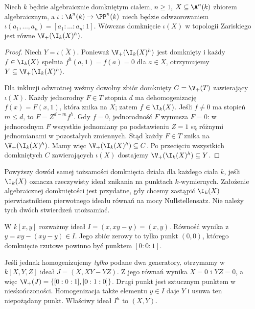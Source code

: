 \begin{twierdzenie}
\label{tw:projective-closure}
Niech $k$ będzie algebraicznie domkniętym ciałem,
$n\ge1$, $X\subseteq\A^n(k)$ zbiorem algebraicznym,
a $\iota:\A^n(k)\to\PP^n(k)$ niech będzie odwzorowaniem
$\iota(a_1,\dots,a_n)=[a_1:\dots:a_n:1]$.
Wówczas domknięcie $\iota(X)$ w topologii Zariskiego jest równe
$\V_+(\I_k(X)^h)$.
\end{twierdzenie}
\begin{proof}
Niech $Y=\overline{\iota(X)}$.
Ponieważ $\V_+(\I_k(X)^h)$ jest domknięty i każdy
$f\in\I_k(X)$ spełnia $f^h(a,1)=f(a)=0$ dla $a\in X$,
otrzymujemy $Y\subseteq\V_+(\I_k(X)^h)$.

Dla inkluzji odwrotnej weźmy dowolny zbiór domknięty
$C=\V_+(T)$ zawierający $\iota(X)$.
Każdy jednorodny $F\in T$ stopnia $d$ ma dehomogenizację
$f(x)=F(x,1)$, która znika na $X$; zatem $f\in\I_k(X)$.
Jeśli $f\ne0$ ma stopień $m\le d$, to
$F=Z^{d-m}f^h$. Gdy $f=0$, jednorodność $F$ wymusza
$F=0$: w jednorodnym $F$ wszystkie jednomiany po podstawieniu
$Z=1$ są różnymi jednomianami w pozostałych zmiennych.
Stąd każdy $F\in T$ znika na $\V_+(\I_k(X)^h)$.
Mamy więc $\V_+(\I_k(X)^h)\subseteq C$.
Po przecięciu wszystkich domkniętych $C$ zawierających
$\iota(X)$ dostajemy $\V_+(\I_k(X)^h)\subseteq Y$.
\end{proof}

\begin{uwaga}
Powyższy dowód samej tożsamości domknięcia działa dla
każdego ciała $k$, jeśli $\I_k(X)$ oznacza rzeczywisty
ideał znikania na punktach $k$-wymiernych. Założenie
algebraicznej domkniętości jest przydatne, gdy chcemy
zastąpić $\I_k(X)$ pierwiastnikiem pierwotnego ideału równań
na mocy Nullstellensatz. Nie należy tych dwóch stwierdzeń
utożsamiać.
\end{uwaga}

\begin{przyklad}
W $k[x,y]$ rozważmy ideał
$I=(x,xy-y)=(x,y)$. Równość wynika z
$y=xy-(xy-y)\in I$. Jego zbiór zerowy to tylko punkt $(0,0)$,
którego domknięcie rzutowe powinno być punktem $[0:0:1]$.

Jeśli jednak homogenizujemy \emph{tylko} podane dwa generatory,
otrzymamy w $k[X,Y,Z]$ ideał
$J=(X,XY-YZ)$. Z jego równań wynika $X=0$ i $YZ=0$,
a więc $\V_+(J)=\{[0:0:1],[0:1:0]\}$.
Drugi punkt jest sztucznym punktem w nieskończoności.
Homogenizacja także elementu $y\in I$ daje $Y$ i usuwa
ten niepożądany punkt. Właściwy ideał $I^h$ to $(X,Y)$.
\end{przyklad}

